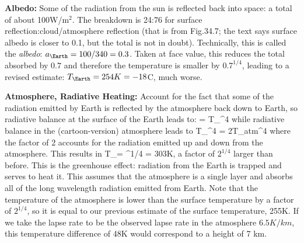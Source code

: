 \documentclass[11pt]{book}
\begin{document}


\bei
\item {\bf Albedo:} Some of the radiation from the sun is reflected back into space: a total of about 100W/m$^2$. The breakdown is 24:76 for surface reflection:cloud/atmosphere reflection (that is from Fig.34.7; the text says surface albedo is closer to 0.1, but the total is not in doubt). Technically, this is called the {\it albedo}: $a_\Earth=100/340=0.3$. Taken at face value, this reduces the total absorbed by $0.7$ and therefore the temperature is smaller by $0.7^{1/4}$, leading to a revised estimate: $T_\Earth=254K=-18$C, much worse.
\item
{\bf Atmosphere, Radiative Heating:} Account for the fact that some of the radiation emitted by Earth is reflected by the atmosphere back down to Earth, so radiative balance at the surface of the Earth leads to:
\be
= %
\sigma T_\Earth^4
\ee
while radiative balance in the (cartoon-version) atmosphere leads to
\be
T_\Earth^4 = 2T_{atm}^4
\ee
where the factor of 2 accounts for the radiation emitted up and down from the atmosphere. This results in
\be
T_\Earth = ^{1/4} = 303K,
\ee
a factor of $2^{1/4}$ larger than before. 
This is the greenhouse effect: radiation from the Earth is trapped and serves to heat it. This assumes that the atmosphere is a single layer and absorbs all of the long wavelength radiation emitted from Earth.
Note that the temperature of the atmosphere is lower than the surface temperature by a factor of $2^{1/4}$, so it is equal to our previous estimate of the surface temperature, 255K. If we take the lapse rate to be the observed lapse rate in the atmosphere $6.5K/km$, this temperature difference of 48K would correspond to a height of 7 km.
\end{document}
